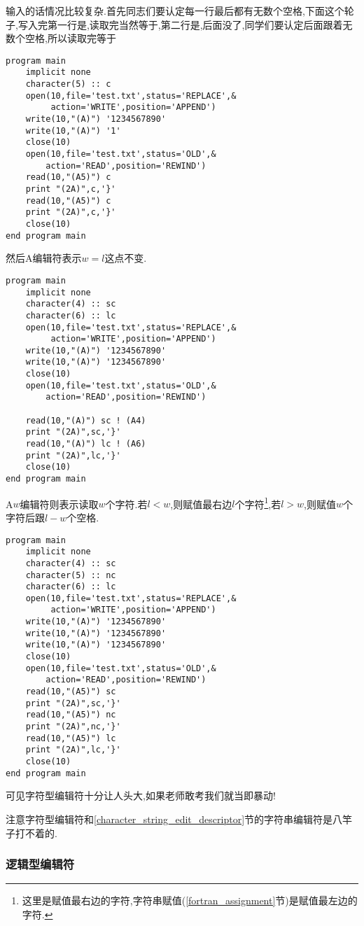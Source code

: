 输入的话情况比较复杂.首先同志们要认定每一行最后都有无数个空格,下面这个轮子,写入完第一行是,读取完当然等于,第二行是,后面没了,同学们要认定后面跟着无数个空格,所以读取完等于
\begin{lstlisting}
program main
    implicit none
    character(5) :: c
    open(10,file='test.txt',status='REPLACE',&
         action='WRITE',position='APPEND')
    write(10,"(A)") '1234567890'
    write(10,"(A)") '1'
    close(10)
    open(10,file='test.txt',status='OLD',&
        action='READ',position='REWIND')
    read(10,"(A5)") c
    print "(2A)",c,'}'
    read(10,"(A5)") c
    print "(2A)",c,'}'
    close(10)
end program main
\end{lstlisting}
然后A编辑符表示$w=l$这点不变.
\begin{lstlisting}
program main
    implicit none
    character(4) :: sc
    character(6) :: lc
    open(10,file='test.txt',status='REPLACE',&
         action='WRITE',position='APPEND')
    write(10,"(A)") '1234567890'
    write(10,"(A)") '1234567890'
    close(10)
    open(10,file='test.txt',status='OLD',&
        action='READ',position='REWIND')

    read(10,"(A)") sc ! (A4)
    print "(2A)",sc,'}'
    read(10,"(A)") lc ! (A6)
    print "(2A)",lc,'}'
    close(10)
end program main
\end{lstlisting}
A$w$编辑符则表示读取$w$个字符.若$l<w$,则赋值最右边$l$个字符\footnote{这里是赋值最右边的字符,字符串赋值(\ref{fortran_assignment}节)是赋值最左边的字符.},若$l>w$,则赋值$w$个字符后跟$l-w$个空格.
\begin{lstlisting}
program main
    implicit none
    character(4) :: sc
    character(5) :: nc
    character(6) :: lc
    open(10,file='test.txt',status='REPLACE',&
         action='WRITE',position='APPEND')
    write(10,"(A)") '1234567890'
    write(10,"(A)") '1234567890'
    write(10,"(A)") '1234567890'
    close(10)
    open(10,file='test.txt',status='OLD',&
        action='READ',position='REWIND')
    read(10,"(A5)") sc
    print "(2A)",sc,'}'
    read(10,"(A5)") nc
    print "(2A)",nc,'}'
    read(10,"(A5)") lc
    print "(2A)",lc,'}'
    close(10)
end program main
\end{lstlisting}

可见字符型编辑符十分让人头大,如果老师敢考我们就当即暴动!

注意字符型编辑符和\ref{character_string_edit_descriptor}节的字符串编辑符是八竿子打不着的.

\subsubsection{逻辑型编辑符}

